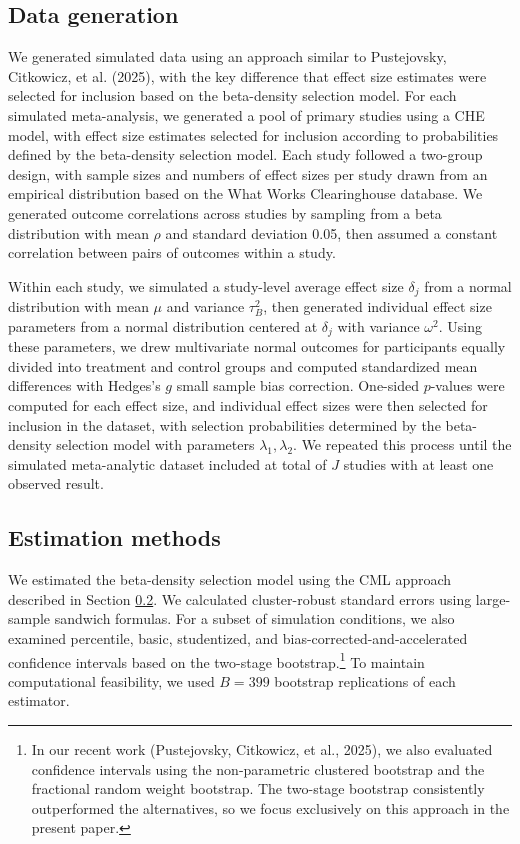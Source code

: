 \documentclass[
  american,
  man, donotrepeattitle,floatsintext]{apa7}
\begin{document}
\subsection{Data generation}\label{data-generation}

We generated simulated data using an approach similar to Pustejovsky, Citkowicz, et al. (2025), with the key difference that effect size estimates were selected for inclusion based on the beta-density selection model. For each simulated meta-analysis, we generated a pool of primary studies using a CHE model, with effect size estimates selected for inclusion according to probabilities defined by the beta-density selection model. Each study followed a two-group design, with sample sizes and numbers of effect sizes per study drawn from an empirical distribution based on the What Works Clearinghouse database. We generated outcome correlations across studies by sampling from a beta distribution with mean \(\rho\) and standard deviation 0.05, then assumed a constant correlation between pairs of outcomes within a study.

Within each study, we simulated a study-level average effect size \(\delta_j\) from a normal distribution with mean \(\mu\) and variance \(\tau^2_B\), then generated individual effect size parameters from a normal distribution centered at \(\delta_j\) with variance \(\omega^2\). Using these parameters, we drew multivariate normal outcomes for participants equally divided into treatment and control groups and computed standardized mean differences with Hedges's \(g\) small sample bias correction. One-sided \(p\)-values were computed for each effect size, and individual effect sizes were then selected for inclusion in the dataset, with selection probabilities determined by the beta-density selection model with parameters \(\lambda_1,\lambda_2\).
We repeated this process until the simulated meta-analytic dataset included at total of \(J\) studies with at least one observed result.

\subsection{Estimation methods}\label{estimation-methods}

We estimated the beta-density selection model using the CML approach described in Section \ref{estimation-methods}. We calculated cluster-robust standard errors using large-sample sandwich formulas. For a subset of simulation conditions, we also examined percentile, basic, studentized, and bias-corrected-and-accelerated confidence intervals based on the two-stage bootstrap.\footnote{In our recent work (Pustejovsky, Citkowicz, et al., 2025), we also evaluated confidence intervals using the non-parametric clustered bootstrap and the fractional random weight bootstrap. The two-stage bootstrap consistently outperformed the alternatives, so we focus exclusively on this approach in the present paper.} To maintain computational feasibility, we used \(B = 399\) bootstrap replications of each estimator.
\end{document}
